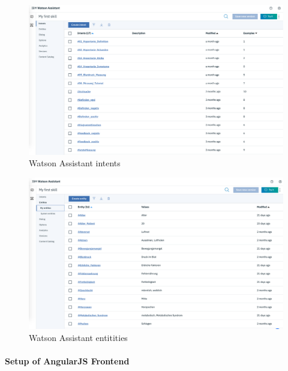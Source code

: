 \begin{figure}[h]
	\centering
	\includegraphics[width=1\textwidth]{images/WA_intents.png}
	\caption{Watson Assistant intents}
	\label{wa_intents}
\end{figure}

\begin{figure}[h]
	\centering
	\includegraphics[width=1\textwidth]{images/WA_entities.png}
	\caption{Watson Assistant entitities}
	\label{wa_entities}
\end{figure}

\paragraph{Setup of AngularJS Frontend}

